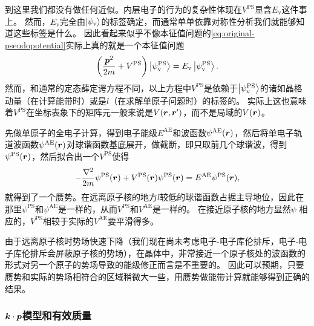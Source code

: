 到这里我们都没有做任何近似。内层电子的行为的复杂性体现在$V^\text{PS}$显含$E_\text{v}$这件事上。
然而，$E_\text{v}$完全由$\ket{\psi_\text{v}}$的标签确定，而通常单单依靠对称性分析我们就能够知道这些标签是什么。
因此看起来似乎不像本征值问题的\eqref{eq:original-pseudopotential}实际上真的就是一个本征值问题
\begin{equation}
    \left( \frac{\vb*{p}^2}{2m} + V^\text{PS} \right) \ket{\psi_\text{v}^\text{PS}} = E_\text{v} \ket{\psi_\text{v}^\text{PS}}.
\end{equation}
然而，和通常的定态薛定谔方程不同，以上方程中$V^\text{PS}$是依赖于$\ket{\psi_\text{v}^\text{PS}}$的诸如晶格动量（在计算能带时）或是$l$（在求解单原子问题时）的标签的。
实际上这也意味着$V^\text{PS}$在坐标表象下的矩阵元一般来说是$V(\vb*{r}, \vb*{r}')$，而不是局域的$V(\vb*{r})$。

先做单原子的全电子计算，得到电子能级$E^\text{AE}$和波函数$\psi^\text{AE}(\vb*{r})$，然后将单电子轨道波函数$\psi^\text{AE}(\vb*{r})$对球谐函数基底展开，做截断，即只取前几个球谐波，得到$\psi^\text{PS}(\vb*{r})$，然后拟合出一个$V^\text{PS}$使得
\begin{equation}
    - \frac{\laplacian}{2m} \psi^\text{PS}(\vb*{r}) + V^\text{PS}(\vb*{r}) \psi^\text{PS}(\vb*{r}) = E^\text{AE} \psi^\text{PS}(\vb*{r}),
\end{equation}
就得到了一个赝势。在远离原子核的地方$l$较低的球谐函数占据主导地位，因此在那里$\psi^\text{PS}$和$\psi^\text{AE}$是一样的，从而$V^\text{PS}$和$V^\text{AE}$是一样的。
在接近原子核的地方显然$\psi$
相应的，$V^\text{PS}$相较于实际的$V^\text{AE}$要平滑得多。

由于远离原子核时势场快速下降（我们现在尚未考虑电子-电子库伦排斥，电子-电子库伦排斥会屏蔽原子核的势场），在晶体中，非常接近一个原子核处的波函数的形式对另一个原子的势场导致的能级修正而言是不重要的。
因此可以预期，只要赝势和实际的势场相符合的区域稍微大一些，用赝势做能带计算就能够得到正确的结果。

\subsubsection{$\vb*{k} \cdot \vb*{p}$模型和有效质量}

